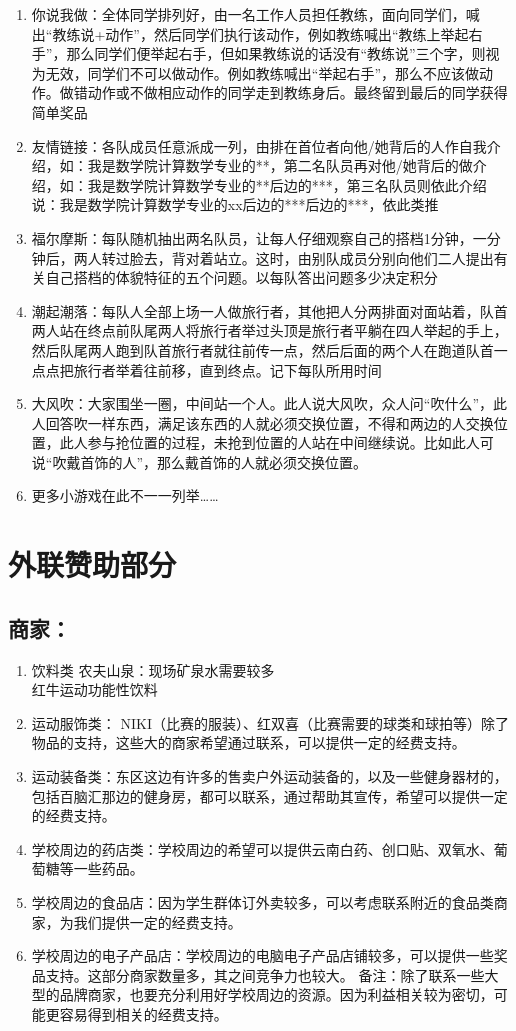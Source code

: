 \documentclass{article}
\begin{document}
\begin{CJK}{UTF8}{gbsn}
\begin{enumerate}
\item 你说我做：全体同学排列好，由一名工作人员担任教练，面向同学们，喊出“教练说+动作”，然后同学们执行该动作，例如教练喊出“教练上举起右手”，那么同学们便举起右手，但如果教练说的话没有“教练说”三个字，则视为无效，同学们不可以做动作。例如教练喊出“举起右手”，那么不应该做动作。做错动作或不做相应动作的同学走到教练身后。最终留到最后的同学获得简单奖品
\item 友情链接：各队成员任意派成一列，由排在首位者向他/她背后的人作自我介绍，如：我是数学院计算数学专业的**，第二名队员再对他/她背后的做介绍，如：我是数学院计算数学专业的**后边的***，第三名队员则依此介绍说：我是数学院计算数学专业的xx后边的***后边的***，依此类推
\item 福尔摩斯：每队随机抽出两名队员，让每人仔细观察自己的搭档1分钟，一分钟后，两人转过脸去，背对着站立。这时，由别队成员分别向他们二人提出有关自己搭档的体貌特征的五个问题。以每队答出问题多少决定积分
\item 潮起潮落：每队人全部上场一人做旅行者，其他把人分两排面对面站着，队首两人站在终点前队尾两人将旅行者举过头顶是旅行者平躺在四人举起的手上，然后队尾两人跑到队首旅行者就往前传一点，然后后面的两个人在跑道队首一点点把旅行者举着往前移，直到终点。记下每队所用时间
\item 大风吹：大家围坐一圈，中间站一个人。此人说大风吹，众人问“吹什么”，此人回答吹一样东西，满足该东西的人就必须交换位置，不得和两边的人交换位置，此人参与抢位置的过程，未抢到位置的人站在中间继续说。比如此人可说“吹戴首饰的人”，那么戴首饰的人就必须交换位置。
\item 更多小游戏在此不一一列举……
\end{enumerate}
\section{外联赞助部分}

\subsection{商家：}
\begin{enumerate}
	\item 饮料类
	农夫山泉：现场矿泉水需要较多\\
	红牛运动功能性饮料
	\item 运动服饰类：
	NIKI（比赛的服装）、红双喜（比赛需要的球类和球拍等）除了物品的支持，这些大的商家希望通过联系，可以提供一定的经费支持。
	\item 运动装备类：东区这边有许多的售卖户外运动装备的，以及一些健身器材的，包括百脑汇那边的健身房，都可以联系，通过帮助其宣传，希望可以提供一定的经费支持。
	\item 学校周边的药店类：学校周边的希望可以提供云南白药、创口贴、双氧水、葡萄糖等一些药品。
	\item 学校周边的食品店：因为学生群体订外卖较多，可以考虑联系附近的食品类商家，为我们提供一定的经费支持。
	\item 学校周边的电子产品店：学校周边的电脑电子产品店铺较多，可以提供一些奖品支持。这部分商家数量多，其之间竞争力也较大。
	备注：除了联系一些大型的品牌商家，也要充分利用好学校周边的资源。因为利益相关较为密切，可能更容易得到相关的经费支持。
\end{enumerate}

\end{CJK}
\end{document}
